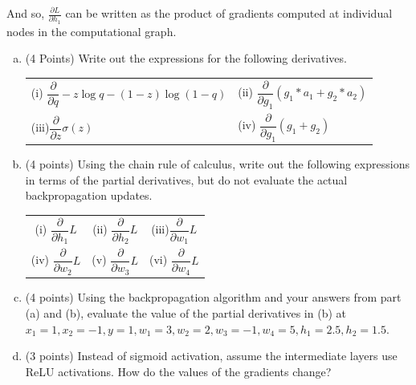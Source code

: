 \documentclass[11pt]{article}
\begin{document}
And so, $\frac{\partial L}{\partial h_1}$ can be written as the product of gradients computed at individual nodes in the computational graph.
\newpage
\begin{enumerate}[(a)]

\item (4 Points)
Write out the expressions for the following derivatives.
\vspace{-2em}
{
\setlength{\tabcolsep}{1em}
\setlength{\extrarowheight}{1em}%
\begin{center}
\begin{tabular}{l l}
(i)  $\dfrac{\partial}{\partial q} -z \log{q} - (1 - z) \log(1 - q) $ &
(ii) $\dfrac{\partial}{\partial g_1} (g_1*a_1 + g_2*a_2)$ \\
(iii)$\dfrac{\partial}{\partial z}\sigma(z)$ &
(iv) $\dfrac{\partial}{\partial g_1} (g_1 + g_2)$ \\
\end{tabular}
\end{center}
}

\begin{answertext}{12cm}{}
  
\end{answertext} 
\newpage 
\item (4 points) Using the chain rule of calculus, write out the following expressions in terms of
the partial derivatives, but do not evaluate the actual backpropagation updates.
\vspace{-2em}
{
\setlength{\tabcolsep}{1em}
\setlength{\extrarowheight}{1em}%
\begin{center}
\begin{tabular}{c c c}
(i)  $\dfrac{\partial}{\partial h_1} L$ &
(ii) $\dfrac{\partial}{\partial h_2} L$ &
(iii)$\dfrac{\partial}{\partial w_1} L$ \\
(iv) $\dfrac{\partial}{\partial w_2} L$ & 
(v)  $\dfrac{\partial}{\partial w_3} L$ & 
(vi) $\dfrac{\partial}{\partial w_4} L$ \\
\end{tabular}
\end{center}
}

\begin{answertext}{12cm}{}
    
  
\end{answertext} 

\clearpage

\item (4 points)
Using the backpropagation algorithm and your answers from part (a) and (b), evaluate the value of the partial derivatives in (b) at $x_1 = 1, x_2 = -1, y = 1, w_1 = 3, w_2 = 2, w_3 = -1, w_4 = 5, h_1 = 2.5, h_2 = 1.5 $.

\begin{answertext}{8cm}{}
    
  
\end{answertext} 
\item (3 points) Instead of sigmoid activation, assume the intermediate layers use ReLU activations. How do the values of the gradients change? 

\begin{answertext}{8cm}{}
    
  
\end{answertext} 

\end{enumerate}
\end{document}
